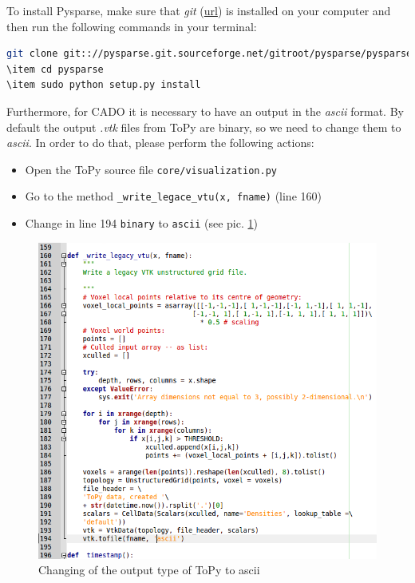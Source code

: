 \documentclass[11pt,a4paper,article,bibtotoc,idxtotoc,headsepline,footsepline,footexclude,DIV13,oneside]{scrbook}
\begin{document}
	To install Pysparse, make sure that \textit{git} (\href{https://git-scm.com/}{url}) is installed on your computer and then run the following commands in your terminal:
\begin{lstlisting}[language=bash]
git clone git:://pysparse.git.sourceforge.net/gitroot/pysparse/pysparse/
\item cd pysparse
\item sudo python setup.py install	
\end{lstlisting}	
	
	Furthermore, for CADO it is necessary to have an output in the \textit{ascii} format. By default the output \textit{.vtk} files from ToPy are binary, so we need to change them to \textit{ascii}. In order to do that, please perform the following actions:
	\begin{itemize}
 		\item Open the ToPy source file \texttt{core/visualization.py}
 		\item Go to the method \texttt{{\_}write{\_}legace{\_}vtu(x, fname)} (line 160)
 		\item Change in line 194 \texttt{binary} to \texttt{ascii} (see pic. \ref{fig:ToPy_CodeChange})
	\end{itemize} 
	\begin{figure}
	\centering
	\includegraphics[scale=0.5]{img/ToPy_CodeChange.png}
	\caption{Changing of the output type of ToPy to ascii}
	\label{fig:ToPy_CodeChange}
	\end{figure}
	
\end{document}
